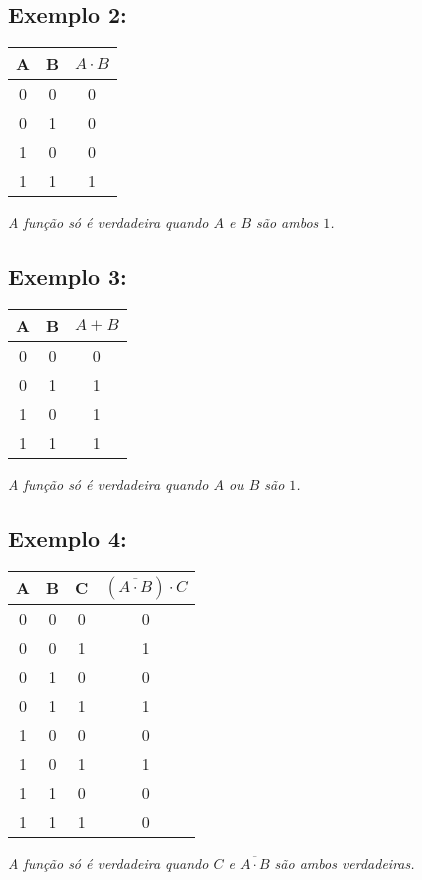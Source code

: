 \documentclass[12pt]{article}
\begin{document}
\subsection*{Exemplo 2:}
\begin{center}
\begin{tabular}{|c|c|c|}
\hline
A & B & \( A \cdot B \) \\
\hline
0 & 0 & 0 \\
0 & 1 & 0 \\
1 & 0 & 0 \\
1 & 1 & 1 \\ 
\hline
\end{tabular}

\vspace{0.5em}
\textit{A função só é verdadeira quando $A$ e $B$ são ambos $1$.}
\end{center}

\subsection*{Exemplo 3:}
\begin{center}
\begin{tabular}{|c|c|c|}
\hline
A & B & \( A + B \) \\
\hline
0 & 0 & 0 \\
0 & 1 & 1 \\
1 & 0 & 1 \\
1 & 1 & 1 \\ 
\hline
\end{tabular}

\vspace{0.5em}
\textit{A função só é verdadeira quando $A$ ou $B$ são $1$.}
\end{center}

\subsection*{Exemplo 4:}
\begin{center}
\begin{tabular}{|c|c|c|c|}
\hline
A & B & C & $ (\overline{A \cdot B}) \cdot C$ \\
\hline
0 & 0 & 0 & 0 \\
0 & 0 & 1 & 1 \\
0 & 1 & 0 & 0 \\
0 & 1 & 1 & 1 \\ 
1 & 0 & 0 & 0 \\
1 & 0 & 1 & 1 \\
1 & 1 & 0 & 0 \\
1 & 1 & 1 & 0 \\ 
\hline
\end{tabular}

\vspace{0.5em}
\textit{A função só é verdadeira quando $C$ e $\overline{A \cdot B}$ são ambos verdadeiras.}
\end{center}
\end{document}
